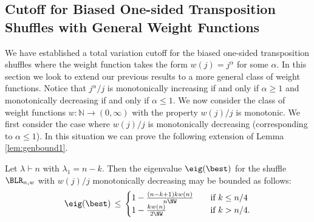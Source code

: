 \documentclass[11pt]{report}
\begin{document}
\subsection{Cutoff for Biased One-sided Transposition Shuffles with General Weight Functions}


We have established a total variation cutoff for the biased one-sided transposition shuffles where the weight function takes the form $w(j) = j^{\alpha}$ for some $\alpha$.  In this section we look to extend our previous results to a more general class of weight functions.
Notice that $j^{\alpha} / j$ is monotonically increasing  if and only if $\alpha \geq 1$ and monotonically decreasing if and only if $\alpha \leq 1$.
We now consider the class of weight functions $w: \mathbb{N} \to (0,\infty)$ with the property $w(j)/j$ is monotonic. We first consider the case where $w(j)/j$ is monotonically decreasing (corresponding to $\alpha \leq 1$). In this situation we can prove the following extension of Lemma \ref{lem:genbound1}.




\begin{lemma}
	\label{chpt5:lem:monodecreasingbound}
	Let $\lambda \vdash n$ with $\lambda_{1} = n-k$. Then the eigenvalue $\eig(\best)$ for the shuffle $\BLR_{n,w}$ with 	$w(j)/j$ monotonically decreasing may be bounded as follows:
	\[
	\eig(\best) \,\le\, 
	\begin{cases}
	1 - \frac{(n-k+1)k w(n)}{n\NW} & \quad \text{if $k \le n/4$} \\
	1 - \frac{k w(n)}{2\NW} & \quad \text{if $k >n/4$.} \\
	\end{cases}
	\]
\end{lemma}
\end{document}
